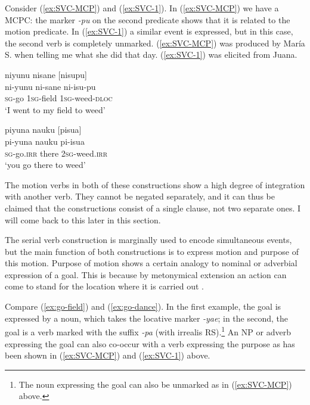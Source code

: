 Consider (\ref{ex:SVC-MCP}) and (\ref{ex:SVC-1}). In (\ref{ex:SVC-MCP}) we have a MCPC: the  marker \textit{-pu} on the second predicate shows that it is related to the motion predicate. In (\ref{ex:SVC-1}) a similar event is expressed, but in this case, the second verb is completely unmarked. %
(\ref{ex:SVC-MCP}) was produced by María S. when telling me what she did that day. (\ref{ex:SVC-1}) was elicited from Juana. 


\ea\label{ex:SVC-MCP}
\begingl
\glpreamble niyunu nisane \textup{[}nisupu\textup{]}\\
\gla ni-yunu ni-sane ni-isu-pu\\
\textsc{sg}-go 1\textsc{sg}-field 1\textsc{sg}-weed-\textsc{dloc}\\
\glft ‘I went to my field to weed’
\endgl
\trailingcitation{[rxx-e120511l.033]}
\xe

\ea\label{ex:SVC-1}
\begingl
\glpreamble piyuna nauku \textup{[}pisua\textup{]}\\
\gla pi-yuna nauku pi-isua\\
\textsc{sg}-go.\textsc{irr} there 2\textsc{sg}-weed.\textsc{irr}\\
\glft ‘you go there to weed’
\endgl
\trailingcitation{[jxx-e191021e-2]}
\xe


The motion verbs in both of these constructions show a high degree of integration with another verb. They cannot be negated separately, and it can thus be claimed that the constructions consist of a single clause, not two separate ones. I will come back to this later in this section.

The serial verb construction is marginally used to encode simultaneous events, but the main function of both constructions is to express motion and purpose of this motion. Purpose of motion shows a certain analogy to nominal or adverbial expression of a goal. This is because by metonymical extension an action can come to stand for the location where it is carried out \citep[98]{SchmidtkeBode2009}.

Compare (\ref{ex:go-field}) and (\ref{ex:go-dance}). In the first example, the goal is expressed by a noun, which takes the locative marker \textit{-yae}; in the second, the goal is a verb marked with the  suffix \textit{-pa} (with irrealis RS).\footnote{The noun expressing the goal can also be unmarked as in (\ref{ex:SVC-MCP}) above.} An NP or adverb expressing the goal can also co-occur with a verb expressing the purpose as has been shown in (\ref{ex:SVC-MCP}) and (\ref{ex:SVC-1}) above.

